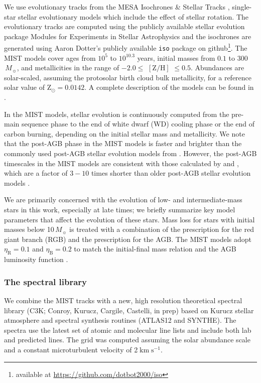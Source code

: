 \documentclass[preprint2]{aastex62}
\newcommand\Msun{\ensuremath{\,M_{\sun}}\xspace}
\newcommand{\kms}{\ensuremath{\;\mathrm{km}\;\mathrm{s}^{-1}}\xspace}
\begin{document}
We use evolutionary tracks from the MESA Isochrones \& Stellar Tracks \citep[MIST\footnote{Documentation, packaged model grids, and a web interpolator are available at \url{http://waps.cfa.harvard.edu/MIST/}};][]{Dotter+2016, Choi+2016}, single-star stellar evolutionary models which include the effect of stellar rotation. The evolutionary tracks are computed using the publicly available stellar evolution package Modules for Experiments in Stellar Astrophysics \citep[MESA v7503;][]{Paxton+2011,Paxton+2013, Paxton+2015} and the isochrones are generated using Aaron Dotter's publicly available \texttt{iso} package on github\footnote{available at \url{https://github.com/dotbot2000/iso}}. The MIST models cover ages from $10^5$ to $10^{10.3}$ years, initial masses from $0.1$ to $300\,$\Msun, and metallicities in the range of $-2.0 \leq$ $[\mathrm{Z}/\mathrm{H}]$ $\leq 0.5$. Abundances are solar-scaled, assuming the \citet{Asplund+2009} protosolar birth cloud bulk metallicity, for a reference solar value of $\mathrm{Z}_{\odot} = 0.0142$.  A complete description of the models can be found in \citet{Choi+2016}.

In the MIST models, stellar evolution is continuously computed from the pre-main sequence phase to the end of white dwarf (WD) cooling phase or the end of carbon burning, depending on the initial stellar mass and metallicity. We note that the post-AGB phase in the MIST models is faster and brighter than the commonly used post-AGB stellar evolution models from \citet{Vassiliadis+1994}. However, the post-AGB timescales in the MIST models are consistent with those calculated by \citet{Miller+2016} and \citet{Weiss+2009}, which are a factor of $3-10$ times shorter than older post-AGB stellar evolution models \citep{Vassiliadis+1994, Bloecker+1995}.

We are primarily concerned with the evolution of low- and intermediate-mass stars in this work, especially at late times; we briefly summarize key model parameters that affect the evolution of these stars. Mass loss for stars with initial masses below 10\Msun is treated with a combination of the \citet{Reimers+1975} prescription for the red giant branch (RGB) and the \citet{Bloecker+1995} prescription for the AGB. The MIST models adopt $\eta_{\mathrm{R}} = 0.1$ and $\eta_{\mathrm{B}} = 0.2$ to match the initial-final mass relation \citep{Kalirai+2009} and the AGB luminosity function \citep{Rosenfield+2014}.

\subsubsection{The spectral library}
We combine the MIST tracks with a new, high resolution theoretical spectral library (C3K; Conroy, Kurucz, Cargile, Castelli, in prep) based on Kurucz stellar atmosphere and spectral synthesis routines (ATLAS12 and SYNTHE). The spectra use the latest set of atomic and molecular line lists and include both lab and predicted lines. The grid was computed assuming the \citet{Asplund+2009} solar abundance scale and a constant microturbulent velocity of 2\kms.
\end{document}
